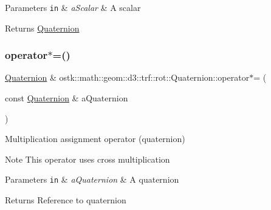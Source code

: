 \begin{DoxyParams}[1]{Parameters}
\mbox{\tt in}  & {\em a\+Scalar} & A scalar \\
\hline
\end{DoxyParams}
\begin{DoxyReturn}{Returns}
\hyperlink{classostk_1_1math_1_1geom_1_1d3_1_1trf_1_1rot_1_1_quaternion}{Quaternion} 
\end{DoxyReturn}
\mbox{\label{classostk_1_1math_1_1geom_1_1d3_1_1trf_1_1rot_1_1_quaternion_a71db9c92c8d780a7ffed6926014dd43b}} 
\subsubsection{\texorpdfstring{operator$\ast$=()}{operator*=()}}
{\footnotesize\ttfamily \hyperlink{classostk_1_1math_1_1geom_1_1d3_1_1trf_1_1rot_1_1_quaternion}{Quaternion} \& ostk\+::math\+::geom\+::d3\+::trf\+::rot\+::\+Quaternion\+::operator$\ast$= (\begin{DoxyParamCaption}\item[{const \hyperlink{classostk_1_1math_1_1geom_1_1d3_1_1trf_1_1rot_1_1_quaternion}{Quaternion} \&}]{a\+Quaternion }\end{DoxyParamCaption})}



Multiplication assignment operator (quaternion) 

\begin{DoxyNote}{Note}
This operator uses cross multiplication
\end{DoxyNote}

\begin{DoxyParams}[1]{Parameters}
\mbox{\tt in}  & {\em a\+Quaternion} & A quaternion \\
\hline
\end{DoxyParams}
\begin{DoxyReturn}{Returns}
Reference to quaternion 
\end{DoxyReturn}
\mbox{\label{classostk_1_1math_1_1geom_1_1d3_1_1trf_1_1rot_1_1_quaternion_a8bf924ca9949a4645501806e7b6b6074}} 
